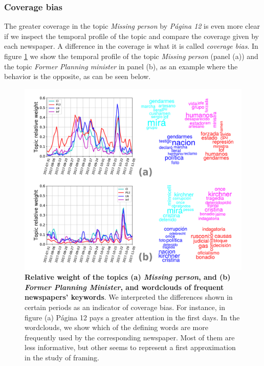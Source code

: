 \subsubsection{Coverage bias}

\par The greater coverage in the topic \emph{Missing person} by \emph{Página 12} is even more clear if we inspect the temporal profile of the topic and compare the coverage given by each newspaper. A difference in the coverage is what it is called \emph{coverage bias}.
In figure \ref{fig:topics_temporal_profiles} we show the temporal profile of the topic \emph{Missing person} (panel (a)) and the topic \emph{Former Planning minister} in panel (b), as an example where the behavior is the opposite, as can be seen below.

\begin{figure}[h]
\centering
\includegraphics[width = \textwidth]{images/Fig7.pdf}
\caption{\textbf{Relative weight of the topics (a) \emph{Missing person}, and (b) \emph{Former Planning Minister}, and wordclouds of frequent newspapers' keywords}. We interpreted the differences shown in certain periods as an indicator of coverage bias. For instance, in figure (a) Página 12 pays a greater attention in the first days. In the wordclouds, we show which of the defining words are more frequently used by the corresponding newspaper. Most of them are less informative, but other seems to represent a first approximation in the study of framing.}
\label{fig:topics_temporal_profiles}
\end{figure}

